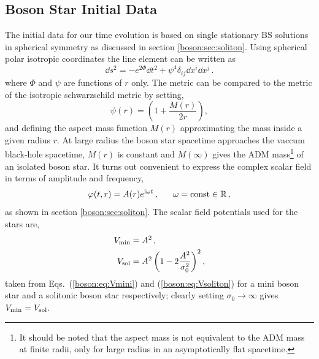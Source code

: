 \subsection{Boson Star Initial Data}
%
The initial data for our time evolution is based on single stationary
BS solutions in spherical symmetry as discussed in section \ref{boson:sec:soliton}.
Using spherical polar isotropic coordinates the
line element can be written as
%
\begin{equation}
  \dd s^2 =
  -e^{2\Phi} \dd t^2
  + \psi^4 \delta_{ij} \dd x^i \dd x^j\,.
  \label{mal:eq:ds2sym}
\end{equation}
%
where $\Phi$ and $\psi$ are functions of $r$ only. The metric can be compared to
the metric of the isotropic schwarzschild metric by setting,
\begin{equation}
\psi(r) = \left(1+\frac{M(r)}{2 r} \right) \label{malaise:eq:aspect_mass_def},
\end{equation}
and defining the aspect mass function $M(r)$ approximating the mass inside a given
radius $r$. At large radius the boson star spacetime approaches the vaccum
black-hole spacetime, $M(r)$ is constant and $M(\infty)$ gives the
ADM mass\footnote{It should be noted that the aspect mass is not equivalent to
the ADM mass at finite radii, only for large radius in an asymptotically flat spacetime.}
of an isolated boson star.
It turns out convenient to express the complex
scalar field in terms of amplitude and frequency,
%
\begin{equation}
  \varphi(t,r) =
  A(r)
  e^{{\rm i} \omega t}\,,~~~~~\omega = \mathrm{const}\in \mathbb{R}\,,
\end{equation}
as shown in section \ref{boson:sec:soliton}. The scalar field potentials used for the stars are,
\begin{align}
  {V}_{\rm min} &= {A}^2\,,~~~~~~~~~~ \label{mal:eq:Vmini} \\
  {V}_{\rm sol} &= {A}^2 \left( 1-2\frac{{A}^2}{{\sigma}_0^2} \right)^2, \label{mal:eq:Vsoliton}
\end{align}
taken from Eqs.~(\ref{boson:eq:Vmini}) and (\ref{boson:eq:Vsoliton}) for a mini boson star and a solitonic boson star respectively; clearly setting $\sigma_0 \rightarrow \infty$ gives $V_{\rm min} = V_{\rm sol}$.




